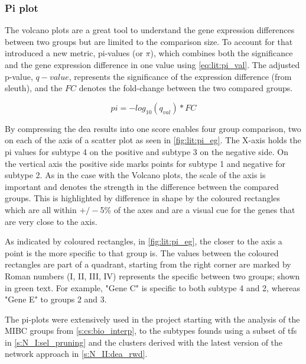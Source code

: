 \subsubsection{Pi plot} \label{s:lit:pi}

The volcano plots are a great tool to understand the gene expression differences between two groups but are limited to the comparison size. To account for that \cite{Xiao2014-zn} introduced a new metric, pi-values (or $\pi$), which combines both the significance and the gene expression difference in one value using \cref{eq:lit:pi_val}. The adjusted p-value, $q-value$, represents the significance of the expression difference (from sleuth), and the $FC$ denotes the fold-change between the two compared groups. 

\begin{equation} \label{eq:lit:pi_val}
    pi = - log_{10}(q_{val}) * FC
\end{equation} 

By compressing the \acrshort{dea} results into one score enables four group comparison, two on each of the axis of a scatter plot as seen in \cref{fig:lit:pi_eg}. The X-axis holds the pi values for subtype 4 on the positive and subtype 3 on the negative side. On the vertical axis the positive side marks points for subtype 1 and negative for subtype 2. As in the case with the Volcano plots, the scale of the axis is important and denotes the strength in the difference between the compared groups. This is highlighted by difference in shape by the coloured rectangles which are all within $+/-$5\% of the axes and are a visual cue for the genes that are very close to the axis.

As indicated by coloured rectangles, in \cref{fig:lit:pi_eg}, the closer to the axis a point is the more specific to that group is. The values between the coloured rectangles are part of a quadrant, starting from the right corner are marked by Roman numbers (I, II, III, IV) represents the specific between two groups; shown in green text. For example, "Gene C" is specific to both subtype 4 and 2, whereas "Gene E" to groups 2 and 3. 

The pi-plots were extensively used in the project starting with the analysis of the MIBC groups from \cref{s:cs:bio_interp}, to the subtypes founds using a subset of \acrlong{tf}s in \cref{s:N_I:sel_pruning} and the clusters derived with the latest version of the network approach in \cref{s:N_II:dea_rwd}.

